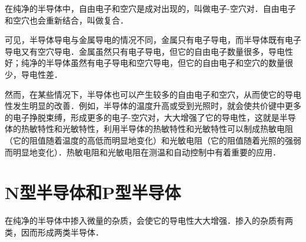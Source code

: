 在纯净的半导体中，自由电子和空穴是成对出现的，叫做电子-空穴对．自由电子和空穴也会重新结合，叫做复合．

可见，半导体导电与金属导电的情况不同，金属只有电子导电，而半导体既有电子导电又有空穴导电．金属虽然只有电子导电，但它的自由电子数量很多，导电性好；纯净的半导体虽然有电子导电和空穴导电，但它的自由电子和空穴的数量很少，导电性差．

然而，在某些情况下，半导体也可以产生较多的自由电子和空穴，从而使它的导电性发生明显的改善．例如，半导体的温度升高或受到光照时，就会使共价键中更多的电子挣脱束缚，形成更多的电子-空穴对，大大增强了它的导电性，这就是半导体的热敏特性和光敏特性，利用半导体的热敏特性和光敏特性可以制成热敏电阻（它的阻值随着温度的高低而明显地变化）和光敏电阻（它的阻值随着光照的强弱而明显地变化）．热敏电阻和光敏电阻在测温和自动控制中有着重要的应用．

\section{N型半导体和P型半导体}
在纯净的半导体中掺入微量的杂质，会使它的导电性大大增强．掺入的杂质有两类，因而形成两类半导体．


